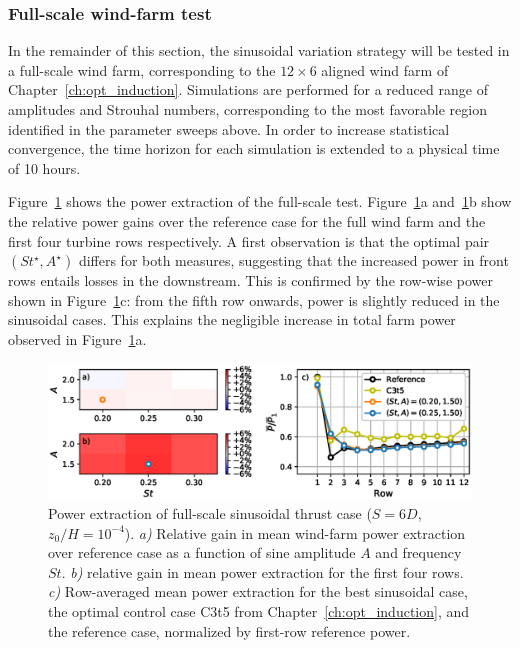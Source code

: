 \subsubsection{Full-scale wind-farm test}
In the remainder of this section, the sinusoidal variation strategy will be tested in a full-scale wind farm, corresponding to the $12 \times 6$ aligned wind farm of Chapter~\ref{ch:opt_induction}. Simulations are performed for a reduced range of amplitudes and Strouhal numbers, corresponding to the most favorable region identified in the parameter sweeps above. In order to increase statistical convergence, the time horizon for each simulation is extended to a physical time of 10 hours. 

Figure~\ref{fig:sinus_fullscale} shows the power extraction of the full-scale test. Figure~\ref{fig:sinus_fullscale}a and~\ref{fig:sinus_fullscale}b show the relative power gains over the reference case for the full wind farm and the first four turbine rows respectively. A first observation is that the optimal pair $(St^\star, A^\star)$ differs for both measures, suggesting that the increased power in front rows entails losses in the downstream. This is confirmed by the row-wise power shown in Figure~\ref{fig:sinus_fullscale}c: from the fifth row onwards, power is slightly reduced in the sinusoidal cases. This explains the negligible increase in total farm power observed in Figure~\ref{fig:sinus_fullscale}a. 

\begin{figure}
	\centering
	\includegraphics[width=\textwidth]{chapters/analysis_induction_control/gains_fullscale.eps}
	\caption{Power extraction of full-scale sinusoidal thrust case ($S = 6D$, $z_0/H = 10^{-4}$). \emph{a) } Relative gain in mean wind-farm power extraction over reference case as a function of sine amplitude $A$ and frequency $St$. \emph{b) } relative gain in mean power extraction for the first four rows. \emph{c) } Row-averaged mean power extraction for the best sinusoidal case, the optimal control case C3t5 from Chapter~\ref{ch:opt_induction}, and the reference case, normalized by first-row reference power.\label{fig:sinus_fullscale} }
\end{figure}

